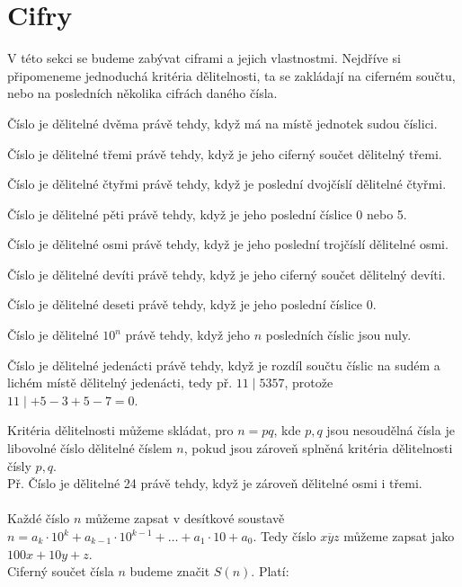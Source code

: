 \documentclass[12pt,a4paper]{report}
\begin{document}
	
\newpage
	
\section{Cifry}
V této sekci se budeme zabývat ciframi a jejich vlastnostmi. Nejdříve si připomeneme jednoduchá kritéria dělitelnosti, ta se zakládají na ciferném součtu, nebo na posledních několika cifrách daného čísla. 
\begin{description}
	\item Číslo je dělitelné dvěma právě tehdy, když má na místě jednotek sudou číslici.
	\item Číslo je dělitelné třemi právě tehdy, když je jeho ciferný součet dělitelný třemi.
	\item Číslo je dělitelné čtyřmi právě tehdy, když je poslední dvojčíslí dělitelné čtyřmi.
	\item Číslo je dělitelné pěti právě tehdy, když je jeho poslední číslice 0 nebo 5.
	\item Číslo je dělitelné osmi právě tehdy, když je jeho poslední trojčíslí dělitelné osmi.
	\item Číslo je dělitelné devíti právě tehdy, když je jeho ciferný součet dělitelný devíti.
	\item Číslo je dělitelné deseti právě tehdy, když je jeho poslední číslice 0.
	\item Číslo je dělitelné $10^n$ právě tehdy, když jeho $n$ posledních číslic jsou nuly. 
	\item Číslo je dělitelné jedenácti právě tehdy, když je rozdíl součtu číslic na sudém a lichém místě dělitelný jedenácti, tedy př. $11 \mid 5357$, protože $11 \mid +5-3+5-7=0$.
\end{description}
Kritéria dělitelnosti můžeme skládat, pro $n=pq$, kde $p,q$ jsou nesoudělná čísla je libovolné číslo dělitelné číslem $n$, pokud jsou zároveň splněná kritéria dělitelnosti čísly $p,q$. 
\\Př. Číslo je dělitelné 24 právě tehdy, když je zároveň dělitelné osmi i třemi.
\\\\Každé číslo $n$ můžeme zapsat v desítkové soustavě $n = a_k \cdot 10^k + a_{k-1} \cdot 10^{k-1} + \ldots + a_1 \cdot 10 + a_0$. Tedy číslo $\overline{xyz}$ můžeme zapsat jako $100x+10y+z$.
\\Ciferný součet čísla $n$ budeme značit $S(n)$. Platí:
\end{document}
